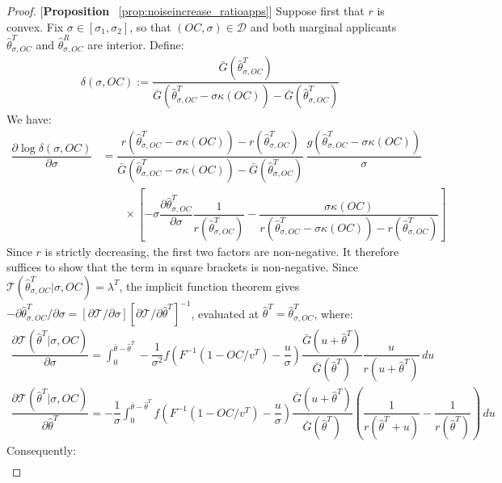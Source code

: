 \begin{proof}{[\textbf{Proposition} ~\ref{prop:noiseincrease_ratioapps}]}
Suppose first that $r$ is convex. Fix $\sigma\in[\sigma_1,\sigma_2]$, so that $(OC,\sigma)\in\mathcal{D}$ and both marginal applicants $\hat{\theta}^T_{\sigma,OC}$ and $\hat{\theta}^R_{\sigma,OC}$ are interior. Define:
\begin{align*}
    \delta(\sigma,OC) := \dfrac{\bar{G}(\hat{\theta}^T_{\sigma,OC})}{\bar{G}(\hat{\theta}^T_{\sigma,OC}-\sigma \kappa(OC)) - \bar{G}(\hat{\theta}^T_{\sigma,OC})} 
\end{align*} 
We have:
\begin{align*}
    \dfrac{\partial \log \delta(\sigma,OC)}{\partial \sigma} 
    &= \dfrac{r(\hat{\theta}^T_{\sigma,OC}-\sigma \kappa(OC))-r(\hat{\theta}^T_{\sigma,OC})}{\bar{G}(\hat{\theta}^T_{\sigma,OC}-\sigma \kappa(OC)) - \bar{G}(\hat{\theta}^T_{\sigma,OC})}\,\dfrac{g(\hat{\theta}^T_{\sigma,OC}-\sigma \kappa(OC))}{\sigma} \\
    &\qquad \times \left[-\sigma \dfrac{\partial \hat{\theta}^T_{\sigma,OC}}{\partial \sigma}\dfrac{1}{r(\hat{\theta}^T_{\sigma,OC})} - \dfrac{\sigma \kappa(OC)}{r(\hat{\theta}^T_{\sigma,OC}-\sigma \kappa(OC))-r(\hat{\theta}^T_{\sigma,OC})}\right]
\end{align*}
Since $r$ is strictly decreasing, the first two factors are non-negative. It therefore suffices to show that the term in square brackets is non-negative. Since $\mathcal{T}(\hat{\theta}^T_{\sigma,OC}|\sigma,OC)=\lambda^T$, the implicit function theorem gives $-\partial \hat{\theta}^T_{\sigma,OC}/\partial \sigma = [\partial \mathcal{T}/\partial \sigma][\partial \mathcal{T}/\partial \hat{\theta}^T]^{-1}$, evaluated at $\hat{\theta}^T=\hat{\theta}^T_{\sigma,OC}$, where:
\begin{gather*}
    \dfrac{\partial \mathcal{T}(\hat{\theta}^T|\sigma,OC)}{\partial \sigma} = \int_{0}^{\bar{\theta} - \hat{\theta}^T}-\dfrac{1}{\sigma^2}f\left(F^{-1}(1-OC/v^T)- \dfrac{u}{\sigma}\right)\dfrac{\bar{G}(u+\hat{\theta}^T)}{\bar{G}(\hat{\theta}^T)}\dfrac{u}{r(u+\hat{\theta}^T)} \,du \\
    \dfrac{\partial \mathcal{T}(\hat{\theta}^T|\sigma,OC)}{\partial \hat{\theta}^T} = -\dfrac{1}{\sigma}\int_{0}^{\bar{\theta}-\hat{\theta}^T}f\left(F^{-1}(1-OC/v^T)-\dfrac{u}{\sigma}\right)\dfrac{\bar{G}(u+\hat{\theta}^T)}{\bar{G}(\hat{\theta}^T)}\left(\dfrac{1}{r(\hat{\theta}^T+u)} - \dfrac{1}{r(\hat{\theta}^T)}\right) \,du
\end{gather*}
Consequently:
\begin{align*}

\end{align*}
\end{proof}
